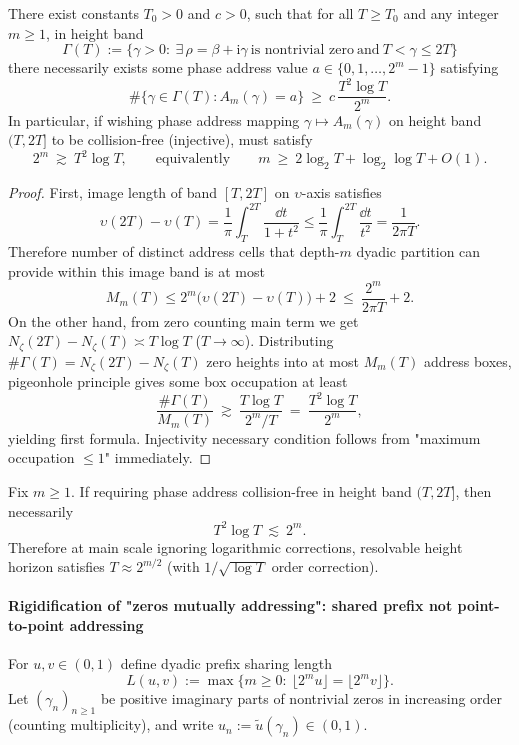 \begin{theorem}\label{thm:xi-phase-prefix-collision-lower-bound}
There exist constants \(T_0>0\) and \(c>0\), such that for all \(T\ge T_0\) and any integer \(m\ge 1\), in height band
\[
\Gamma(T):=\{\gamma>0:\ \exists\,\rho=\beta+\mathrm{i}\gamma\ \text{is nontrivial zero}\ \text{and}\ T<\gamma\le 2T\}
\]
there necessarily exists some phase address value \(a\in\{0,1,\dots,2^m-1\}\) satisfying
\[
\#\{\gamma\in\Gamma(T):A_m(\gamma)=a\}\ \ge\ c\,\frac{T^2\log T}{2^m}.
\]
In particular, if wishing phase address mapping \(\gamma\mapsto A_m(\gamma)\) on height band \((T,2T]\) to be collision-free (injective), must satisfy
\[
2^m\ \gtrsim\ T^2\log T,
\qquad\text{equivalently}\qquad
m\ \ge\ 2\log_2 T+\log_2\log T+O(1).
\]
\end{theorem}

\begin{proof}
First, image length of band \([T,2T]\) on \(\upsilon\)-axis satisfies
\[
\upsilon(2T)-\upsilon(T)=\frac{1}{\pi}\int_T^{2T}\frac{\dd t}{1+t^2}
\le \frac{1}{\pi}\int_T^{2T}\frac{\dd t}{t^2}
=\frac{1}{2\pi T}.
\]
Therefore number of distinct address cells that depth-\(m\) dyadic partition can provide within this image band is at most
\[
M_m(T)\le 2^m\bigl(\upsilon(2T)-\upsilon(T)\bigr)+2\ \le\ \frac{2^m}{2\pi T}+2.
\]
On the other hand, from zero counting main term we get \(N_\zeta(2T)-N_\zeta(T)\asymp T\log T\) (\(T\to\infty\)).
Distributing \(\#\Gamma(T)=N_\zeta(2T)-N_\zeta(T)\) zero heights into at most \(M_m(T)\) address boxes, pigeonhole principle gives some box occupation at least
\[
\frac{\#\Gamma(T)}{M_m(T)}\ \gtrsim\ \frac{T\log T}{2^m/T}\ =\ \frac{T^2\log T}{2^m},
\]
yielding first formula. Injectivity necessary condition follows from "maximum occupation \(\le 1\)" immediately.
\end{proof}

\begin{corollary}\label{cor:xi-phase-prefix-clarity-horizon}
Fix \(m\ge 1\). If requiring phase address collision-free in height band \((T,2T]\), then necessarily
\[
T^2\log T\ \lesssim\ 2^m.
\]
Therefore at main scale ignoring logarithmic corrections, resolvable height horizon satisfies \(T\approx 2^{m/2}\) (with \(1/\sqrt{\log T}\) order correction).
\end{corollary}

\paragraph{Rigidification of "zeros mutually addressing": shared prefix not point-to-point addressing}
For \(u,v\in(0,1)\) define dyadic prefix sharing length
\[
L(u,v):=\max\{m\ge 0:\ \lfloor 2^m u\rfloor=\lfloor 2^m v\rfloor\}.
\]
Let \((\gamma_n)_{n\ge 1}\) be positive imaginary parts of nontrivial zeros in increasing order (counting multiplicity), and write \(u_n:=\widetilde u(\gamma_n)\in(0,1)\).

